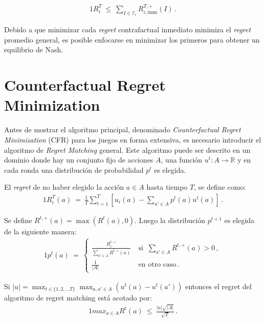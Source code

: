 \begin{theorem}
\begin{alignat}{1}
R_i^T\ \leq\ \sum_{I \in \mathcal{I}_i} R_{i, \text{imm}}^{T, +}(I) \,.
\end{alignat}
\end{theorem}

Debido a que minimizar cada \textit{regret} contrafactual inmediato minimiza el \textit{regret} promedio general, es posible enfocarse en minimizar los primeros para obtener un equilibrio de Nash.

\section{Counterfactual Regret Minimization}
\label{section:cfr}

Antes de mostrar el algoritmo principal, denominado \textit{Counterfactual Regret Minimization} (CFR) para los juegos en forma extensiva, es necesario introducir el algoritmo de \textit{Regret Matching} general. Este algoritmo puede ser descrito en un dominio donde hay un conjunto fijo de acciones $A$, una función $u^t : A \rightarrow \mathbb{R}$ y en cada ronda una distribución de probabilidad $p^t$ es elegida.

\begin{definition}
\label{def:regret}
El \textit{regret} de no haber elegido la acción $a \in A$ hasta tiempo $T$, se define como:
\begin{alignat}{1}
R_i^T(a)\ =\ \frac{1}{T} \sum_{t = 1}^T \left[u_i(a) - \sum_{a' \in A}p^t(a)u^t(a)\right] \,.
\end{alignat}
\end{definition}

Se define $R^{t, +}(a) = \max(R^t(a), 0)$. Luego la distribución $p^{t+1}$ es elegida de la siguiente manera:
\begin{alignat}{1}
p^t(a)\ =\ 
\begin{cases}
\frac{R_i^{t, +}}{\sum_{a' \in A} R^{t, +}(a)}\ & \text{si }\ \sum_{a' \in A} R^{t, +}(a) > 0 \,, \\
\frac{1}{|A|}\ & \text{en otro caso} \,.
\end{cases}
\end{alignat}

\begin{theorem}
Si $|u| = \max_{t \in \{1, 2, ... T\}} \max_{a, a' \in A}(u^t(a) - u^t(a'))$ entonces el regret del algoritmo de regret matching está acotado por:
\begin{alignat}{1}
max_{a \in A}R^t(a)\ \leq\ \frac{|u| \sqrt{|A|}}{\sqrt T} \,.
\end{alignat}
\end{theorem}

